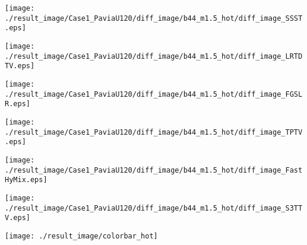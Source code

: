 \begin{figure*}[t]
\begin{center}
		\begin{minipage}{0.125\hsize}
			\centerline{\hspace{\hsize}} %
		\end{minipage}
		\begin{minipage}{0.125\hsize}
			\centerline{\texttt{[image: ./result\_image/Case1\_PaviaU120/diff\_image/b44\_m1.5\_hot/diff\_image\_SSST.eps]}} %
		\end{minipage}
		\begin{minipage}{0.125\hsize}
			\centerline{\texttt{[image: ./result\_image/Case1\_PaviaU120/diff\_image/b44\_m1.5\_hot/diff\_image\_LRTDTV.eps]}} %
		\end{minipage}
		\begin{minipage}{0.125\hsize}
			\centerline{\texttt{[image: ./result\_image/Case1\_PaviaU120/diff\_image/b44\_m1.5\_hot/diff\_image\_FGSLR.eps]}} %
		\end{minipage}
		\begin{minipage}{0.125\hsize}
			\centerline{\texttt{[image: ./result\_image/Case1\_PaviaU120/diff\_image/b44\_m1.5\_hot/diff\_image\_TPTV.eps]}} %
		\end{minipage}
		\begin{minipage}{0.125\hsize}
			\centerline{\texttt{[image: ./result\_image/Case1\_PaviaU120/diff\_image/b44\_m1.5\_hot/diff\_image\_FastHyMix.eps]}} %
		\end{minipage}
		\begin{minipage}{0.125\hsize}
			\centerline{\texttt{[image: ./result\_image/Case1\_PaviaU120/diff\_image/b44\_m1.5\_hot/diff\_image\_S3TTV.eps]}} %
		\end{minipage}
		\begin{minipage}{0.050\hsize}
			\centerline{\texttt{[image: ./result\_image/colorbar\_hot]}} %
		\end{minipage}
		
		\vspace{1mm}
		

\end{center}
\end{figure*}
